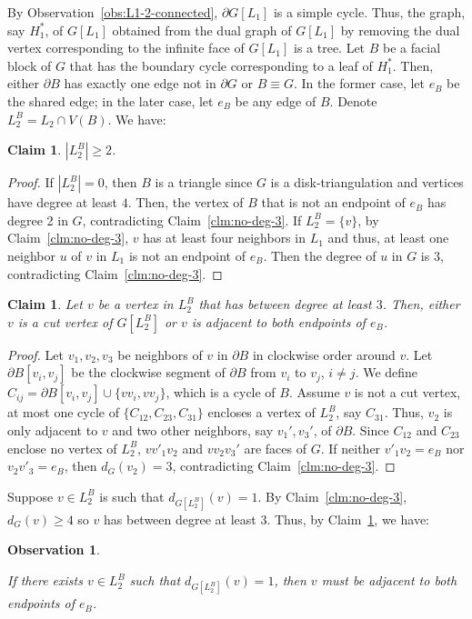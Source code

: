 \documentclass[11pt]{article}
\newtheorem{claim}[theorem]{Claim}
\newtheorem{observation}[theorem]{Observation}
\begin{document}
By Observation~\ref{obs:L1-2-connected}, $\partial G[L_1]$ is a simple cycle. Thus, the graph, say $H_1^*$, of $G[L_1]$ obtained from the dual graph of $G[L_1]$ by removing the dual vertex corresponding to the infinite face of $G[L_1]$ is a tree.  Let $B$ be a facial block of $G$ that has the boundary cycle corresponding to a leaf of $H_1^*$. Then, either $\partial B$ has exactly one edge not in $\partial G$ or $B \equiv G$. In the former case, let $e_B$ be the shared edge; in the later case, let $e_B$ be any edge of $B$. Denote $L_2^B = L_2\cap V(B)$. We have: 

\begin{claim}\label{clm:l2b-non-empty}
$|L_2^B| \geq 2$.
\end{claim}  
\begin{proof}
If $|L_2^B| = 0$, then $B$ is a triangle since $G$ is a disk-triangulation and vertices have degree at least $4$. Then, the vertex of $B$ that is not an endpoint of $e_B$ has degree 2 in $G$, contradicting Claim~\ref{clm:no-deg-3}. If $L_2^B = \{v\}$,  by Claim~\ref{clm:no-deg-3}, $v$ has at least four neighbors in $L_1$ and thus, at least one neighbor $u$ of $v$ in $L_1$ is not an endpoint of $e_B$. Then the degree of $u$ in $G$ is 3, contradicting Claim~\ref{clm:no-deg-3}.
\end{proof}

\begin{claim} \label{clm:non-cut-deg}
Let $v$ be a vertex in $L_2^B$ that has between degree at least $3$. Then, either $v$ is a cut vertex of $G[L^B_2]$ or $v$ is adjacent to both endpoints of $e_B$.
\end{claim}
\begin{proof}
Let $v_1,v_2,v_3$ be neighbors of $v$  in $\partial B$ in clockwise  order around $v$. Let $\partial B[v_i,v_j]$ be the clockwise segment of $\partial B$ from $v_i$ to $v_j$, $i\not= j$. We define $C_{ij} =  \partial B[v_i,v_j] \cup \{vv_i,vv_j\}$, which is a cycle of $B$. Assume $v$ is not a cut vertex, at most one cycle of $\{C_{12},C_{23}, C_{31}\}$ encloses a vertex of $L_2^B$, say $C_{31}$. Thus, $v_2$ is only adjacent to $v$ and two other neighbors, say $v_1',v_3'$, of $\partial B$. Since $C_{12}$ and $C_{23}$ enclose no vertex of $L_2^B$, $vv'_1v_2$ and $vv_2v_3'$ are faces of $G$. If neither $v'_1v_2 = e_B$ nor $v_2v'_3 = e_B$, then $d_G(v_2) = 3$,  contradicting Claim~\ref{clm:no-deg-3}.
\end{proof}
Suppose $v \in L^B_2$ is such that $d_{G[L_2^B]}(v) = 1$. By Claim~\ref{clm:no-deg-3}, $d_G(v) \geq 4$ so  $v$ has between degree at least $3$. Thus, by Claim~\ref{clm:non-cut-deg}, we have:
\begin{observation}\label{obs:in-degree-one}

If there exists $v \in L_2^B$ such that $d_{G[L^B_2]}(v) = 1$, then $v$ must be adjacent to both endpoints of $e_B$. 
\end{observation} 
\end{document}
